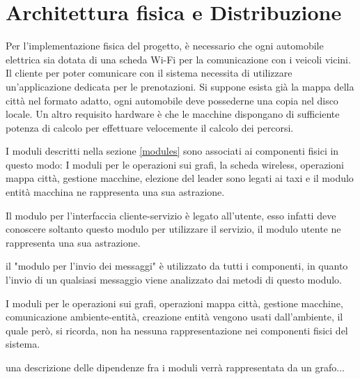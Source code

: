 \section{Architettura fisica e Distribuzione} \label{arch_fisica}
Per l'implementazione fisica del progetto, è necessario che ogni automobile elettrica sia dotata di una scheda Wi-Fi per la comunicazione con i veicoli vicini. Il cliente per poter comunicare con il sistema necessita di utilizzare un'applicazione dedicata per le prenotazioni. Si suppone esista già la mappa della città nel formato adatto, ogni automobile deve possederne una copia nel disco locale. Un altro requisito hardware è che le macchine dispongano di sufficiente potenza di calcolo per effettuare velocemente il calcolo dei percorsi.

I moduli descritti nella sezione \ref{modules} sono associati ai componenti fisici in questo modo:
I moduli per le operazioni sui grafi, la scheda wireless, operazioni mappa città, gestione macchine, elezione del leader sono legati ai taxi e il modulo entità macchina ne rappresenta una sua astrazione.

Il modulo per l'interfaccia cliente-servizio è legato all'utente, esso infatti deve conoscere soltanto questo modulo per utilizzare il servizio, il modulo utente ne rappresenta una sua astrazione.

il "modulo per l'invio dei messaggi" è utilizzato da tutti i componenti, in quanto l'invio di un qualsiasi messaggio viene analizzato dai metodi di questo modulo.

I moduli per le operazioni sui grafi, operazioni mappa città, gestione macchine, comunicazione ambiente-entità, creazione entità vengono usati dall'ambiente, il quale però, si ricorda, non ha nessuna rappresentazione nei componenti fisici del sistema.

una descrizione delle dipendenze fra i moduli verrà rappresentata da un grafo...

